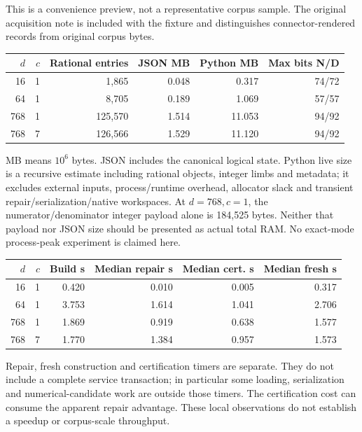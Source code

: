 \documentclass[11pt,a4paper]{article}
\begin{document}
This is a convenience preview, not a representative corpus sample. The
original acquisition note is included with the fixture and distinguishes
connector-rendered records from original corpus bytes.

\begin{center}\small
\begin{tabular}{rrr rrr}\toprule
$d$ & $c$ & Rational entries & JSON MB & Python MB & Max bits N/D\\\midrule
16 & 1 & 1,865 & 0.048 & 0.317 & 74/72 \\
64 & 1 & 8,705 & 0.189 & 1.069 & 57/57 \\
768 & 1 & 125,570 & 1.514 & 11.053 & 94/92 \\
768 & 7 & 126,566 & 1.529 & 11.120 & 94/92 \\
\bottomrule\end{tabular}\end{center}
MB means $10^6$ bytes. JSON includes the canonical logical state. Python live
size is a recursive estimate including rational objects, integer limbs and
metadata; it excludes external inputs, process/runtime overhead, allocator
slack and transient repair/serialization/native workspaces. At $d=768,c=1$,
the numerator/denominator integer payload alone is 184,525 bytes. Neither that
payload nor JSON size should be presented as actual total RAM. No exact-mode
process-peak experiment is claimed here.

\begin{center}\small
\begin{tabular}{rrrrrr}\toprule
$d$ & $c$ & Build s & Median repair s & Median cert. s & Median fresh s\\\midrule
16 & 1 & 0.420 & 0.010 & 0.005 & 0.317 \\
64 & 1 & 3.753 & 1.614 & 1.041 & 2.706 \\
768 & 1 & 1.869 & 0.919 & 0.638 & 1.577 \\
768 & 7 & 1.770 & 1.384 & 0.957 & 1.573 \\
\bottomrule\end{tabular}\end{center}
Repair, fresh construction and certification timers are separate. They do
not include a complete service transaction; in particular some loading,
serialization and numerical-candidate work are outside those timers. The
certification cost can consume the apparent repair advantage. These local
observations do not establish a speedup or corpus-scale throughput.
\end{document}
